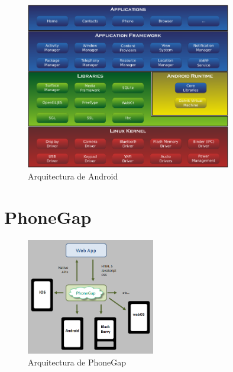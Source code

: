 \begin{figure}[htbp]
  \centering
    \includegraphics[width=0.8\textwidth]{imagenes/arquitecturaAndroid.png}
    
     \caption{Arquitectura de Android}
    \label{fig:arquitectura-android}
\end{figure}

\section{PhoneGap}

\begin{figure}[htbp]
  \centering
    \includegraphics[width=0.5\textwidth]{imagenes/phonegap.png}
    
     \caption{Arquitectura de PhoneGap}
    \label{arquitectura-phonegap}
\end{figure}

